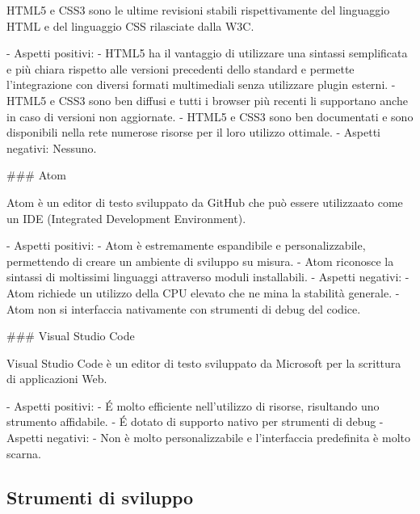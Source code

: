 HTML5 e CSS3 sono le ultime revisioni stabili rispettivamente del linguaggio HTML e del linguaggio CSS rilasciate dalla W3C.

-   Aspetti positivi:
    -   HTML5 ha il vantaggio di utilizzare una sintassi semplificata e più chiara rispetto alle versioni precedenti dello standard e permette l’integrazione con diversi formati multimediali senza utilizzare plugin esterni.
    -   HTML5 e CSS3 sono ben diffusi e tutti i browser più recenti li supportano anche in caso di versioni non aggiornate.
    -   HTML5 e CSS3 sono ben documentati e sono disponibili nella rete numerose risorse per il loro utilizzo ottimale.
-   Aspetti negativi: Nessuno.


### Atom

Atom è un editor di testo sviluppato da GitHub che può essere utilizzaato come un IDE (Integrated Development Environment).

-   Aspetti positivi:
    -   Atom è estremamente espandibile e personalizzabile, permettendo di creare un ambiente di sviluppo su misura.
    -   Atom riconosce la sintassi di moltissimi linguaggi attraverso moduli installabili.
-   Aspetti negativi:
    -   Atom richiede un utilizzo della CPU elevato che ne mina la stabilità generale.
    -   Atom non si interfaccia nativamente con strumenti di debug del codice.


### Visual Studio Code

Visual Studio Code è un editor di testo sviluppato da Microsoft per la scrittura di applicazioni Web.

-   Aspetti positivi:
    -   É molto efficiente nell'utilizzo di risorse, risultando uno strumento affidabile.
    -   É dotato di supporto nativo per strumenti di debug
-   Aspetti negativi:
    -   Non è molto personalizzabile e l'interfaccia predefinita è molto scarna.

\subsection{Strumenti di sviluppo}

%

